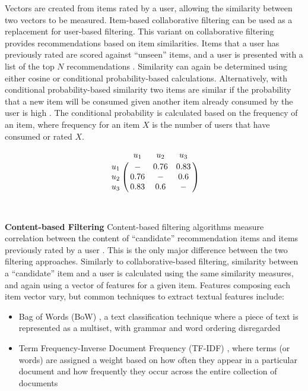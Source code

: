 Vectors are created from items rated by a user, allowing the similarity between two vectors to be measured. Item-based collaborative filtering can be used as a replacement for user-based filtering. This variant on collaborative filtering provides recommendations based on item similarities. Items that a user has previously rated are scored against ``unseen'' items, and a user is presented with a list of the top $N$ recommendations \cite{sarwar2001item}. Similarity can  again be determined using either cosine or conditional probability-based calculations. Alternatively, with conditional probability-based similarity two items are similar if the probability that a new item will be consumed given another item already consumed by the user is high \cite{sarwar2001item}. The conditional probability is calculated based on the frequency of an item, where frequency for an item $X$ is the number of users that have consumed or rated $X$. 

\begin{equation}
\bordermatrix{~ & u_1 & u_2 & u_3 \cr
            u_1 & - & 0.76 & 0.83 \cr
            u_2 & 0.76 & - & 0.6\cr
            u_3 & 0.83 & 0.6 & - \cr}
\label{example:similarity-matrix}
\end{equation}
\\
\\
\textbf{Content-based Filtering} Content-based filtering algorithms measure correlation between the content of ``candidate'' recommendation items and items previously rated by a user \cite{van2000using}. This is the only major difference between the two filtering approaches. Similarly to collaborative-based filtering, similarity between a ``candidate'' item and a user is calculated using the same similarity measures, and again using a vector of features for a given item. Features composing each item vector vary, but common techniques to extract textual features include:
\begin{itemize}
\item Bag of Words (BoW) \cite{vanetti2010content}, a text classification technique where a piece of text is represented as a multiset, with grammar and word ordering disregarded \cite{scikit:bow}
\item Term Frequency-Inverse Document Frequency (TF-IDF) \cite{van2000using}, where terms (or words) are assigned a weight based on how often they appear in a particular document and how frequently they occur across the entire collection of documents \cite{scikit:tfidf}
\end{itemize} 

